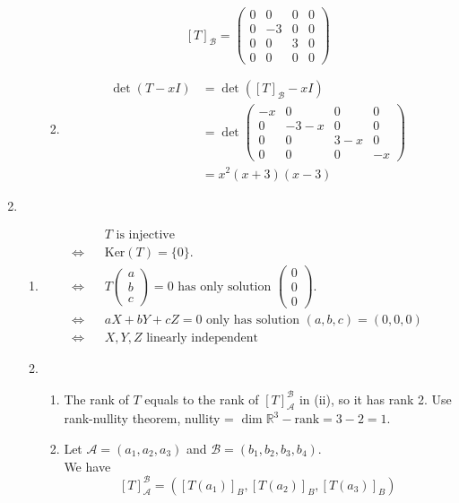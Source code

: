 \documentclass[12pt]{article}
\newcommand{\kerne}{\mathrm{Ker}}
\theoremstyle{definition}
\begin{document}
\begin{enumerate}
\begin{enumerate}
\begin{enumerate}
    \[
[T]_\mathcal{B} = \begin{pmatrix}0&0&0&0\\0&-3&0&0\\0&0&3&0\\0&0&0&0\end{pmatrix}
    \]
    \item \begin{align*}\det(T-xI)&=\det([T]_\mathcal{B}-xI)\\
         &= \det \begin{pmatrix}-x&0&0&0\\0&-3-x&0&0\\0&0&3-x&0\\0&0&0&-x\end{pmatrix}\\
         &=x^2(x+3)(x-3)
    \end{align*}
  \end{enumerate}
  \end{enumerate}
  \item \begin{enumerate}
  \item  \begin{align*}
  &T \text{ is injective}\\
  \Leftrightarrow\;\;\;&\kerne(T)=\{0\}.\\
  \Leftrightarrow\;\;\;&T\begin{pmatrix}a\\b\\c\end{pmatrix}=0\text{ has only solution }\begin{pmatrix}0\\0\\0\end{pmatrix}. \\
  \Leftrightarrow\;\;\;&aX+bY+cZ = 0\text{ only has solution }(a,b,c) = (0,0,0)\\
  \Leftrightarrow\;\;\;&X,Y,Z\text{ linearly independent}
  \end{align*}
  \item \begin{enumerate}
\item The rank of $T$ equals to the rank of $[T]_\mathcal{A}^\mathcal{B}$ in (ii), so it has rank 2. Use rank-nullity theorem, nullity = $\dim \mathbb{R}^3-\text{rank} = 3-2 = 1$.
  \item Let $\mathcal{A}=(a_1,a_2,a_3)$ and $\mathcal{B}=(b_1,b_2,b_3,b_4)$. \\We have
  \[
[T]_\mathcal{A}^\mathcal{B} = ([T(a_1)]_B,[T(a_2)]_B,[T(a_3)]_B)
\]
\end{enumerate}
\end{enumerate}
\end{enumerate}
\end{document}
